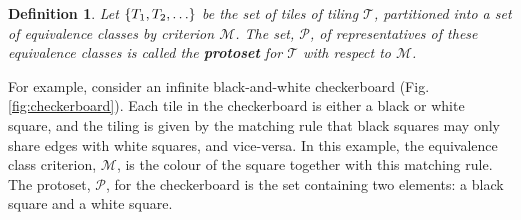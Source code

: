 \documentclass[]{article}
\newtheorem{mydef}{Definition}
\begin{document}
\begin{mydef}
Let $\{T_1,T_2,\mathellipsis\}$ be the set of tiles of tiling $\mathcal{T}$, partitioned into a set of equivalence classes by criterion $\mathcal{M}$. The set, $\mathcal{P}$, of representatives of these equivalence classes is called the \textbf{protoset} for $\mathcal{T}$ with respect to $\mathcal{M}$.
\end{mydef}

For example, consider an infinite black-and-white checkerboard (Fig.\ref{fig:checkerboard}). Each tile in the checkerboard is either a black or white square, and the tiling is given by the matching rule that black squares may only share edges with white squares, and vice-versa. In this example, the equivalence class criterion, $\mathcal{M}$, is the colour of the square together with this matching rule. The protoset, $\mathcal{P}$, for the checkerboard is the set containing two elements: a black square and a white square.
\end{document}
